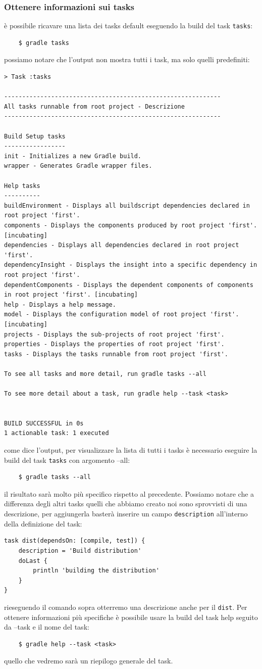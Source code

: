 \subsubsection{Ottenere informazioni sui tasks} è possibile ricavare una lista dei tasks default eseguendo la build del task \texttt{tasks}:
\begin{verbatim}
    $ gradle tasks \end{verbatim}
possiamo notare che l'output non mostra tutti i task, ma solo quelli predefiniti:
\begin{verbatim}
> Task :tasks 

------------------------------------------------------------
All tasks runnable from root project - Descrizione
------------------------------------------------------------

Build Setup tasks
-----------------
init - Initializes a new Gradle build.
wrapper - Generates Gradle wrapper files.

Help tasks
----------
buildEnvironment - Displays all buildscript dependencies declared in root project 'first'.
components - Displays the components produced by root project 'first'. [incubating]
dependencies - Displays all dependencies declared in root project 'first'.
dependencyInsight - Displays the insight into a specific dependency in root project 'first'.
dependentComponents - Displays the dependent components of components in root project 'first'. [incubating]
help - Displays a help message.
model - Displays the configuration model of root project 'first'. [incubating]
projects - Displays the sub-projects of root project 'first'.
properties - Displays the properties of root project 'first'.
tasks - Displays the tasks runnable from root project 'first'.

To see all tasks and more detail, run gradle tasks --all

To see more detail about a task, run gradle help --task <task>


BUILD SUCCESSFUL in 0s
1 actionable task: 1 executed \end{verbatim}
come dice l'output, per visualizzare la lista di tutti i tasks è necessario eseguire la build del task \texttt{tasks} con argomento --all:
\begin{verbatim}
    $ gradle tasks --all \end{verbatim}
    il risultato sarà molto più specifico rispetto al precedente. Possiamo notare che a differenza degli altri tasks quelli che abbiamo creato noi sono sprovvisti di una descrizione, per aggiungerla basterà inserire un campo \texttt{description} all'interno della definizione del task:
    \begin{verbatim}
task dist(dependsOn: [compile, test]) {
    description = 'Build distribution'
    doLast {
        println 'building the distribution'
    }
} \end{verbatim}
rieseguendo il comando sopra otterremo una descrizione anche per il \texttt{dist}. Per ottenere informazioni più specifiche è possibile usare la build del task help seguito da --task e il nome del task:
\begin{verbatim}
    $ gradle help --task <task> \end{verbatim}
quello che vedremo sarà un riepilogo generale del task.